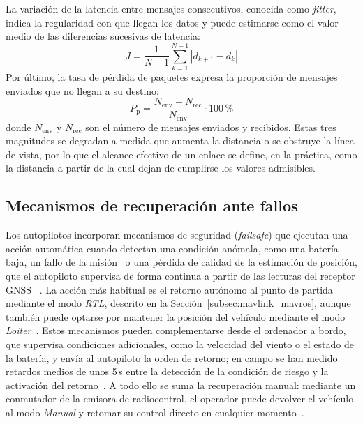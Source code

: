 La variación de la latencia entre mensajes consecutivos, conocida como \textit{jitter},
indica la regularidad con que llegan los datos y puede estimarse como el valor medio de
las diferencias sucesivas de latencia:
\begin{equation}
  J = \frac{1}{N-1}\sum_{k=1}^{N-1}\left| d_{k+1} - d_{k} \right|
  \label{eq:jitter}
\end{equation}
Por último, la tasa de pérdida de paquetes expresa la proporción de mensajes enviados
que no llegan a su destino:
\begin{equation}
  P_{\mathrm{p}} = \frac{N_{\mathrm{env}} - N_{\mathrm{rec}}}{N_{\mathrm{env}}}\cdot 100\,\%
  \label{eq:perdida_paquetes}
\end{equation}
donde $N_{\mathrm{env}}$ y $N_{\mathrm{rec}}$ son el número de mensajes enviados y
recibidos. Estas tres magnitudes se degradan a medida que aumenta la distancia o se
obstruye la línea de vista, por lo que el alcance efectivo de un enlace se define, en la
práctica, como la distancia a partir de la cual dejan de cumplirse los valores
admisibles.
 
\subsection{Mecanismos de recuperación ante fallos}
\label{subsec:failsafe}
 
Los autopilotos incorporan mecanismos de seguridad (\textit{failsafe}) que ejecutan una
acción automática cuando detectan una condición anómala, como una batería baja, un
fallo de la misión~\cite{kumar2025} o una pérdida de calidad de la estimación de
posición, que el autopiloto supervisa de forma continua a partir de las lecturas del
receptor GNSS~\cite{kumar2025} \cite{aliane2026}.
La acción más habitual es el retorno autónomo al punto de partida mediante el modo
\textit{RTL}, descrito en la Sección~\ref{subsec:mavlink_mavros}, aunque también puede optarse
por mantener la posición del vehículo mediante el modo \textit{Loiter}~\cite{kumar2025}. Estos mecanismos pueden
complementarse desde el ordenador a bordo, que supervisa condiciones adicionales, como
la velocidad del viento o el estado de la batería, y envía al autopiloto la orden de
retorno; en campo se han medido retardos medios de unos 5\,s entre la detección de la
condición de riesgo y la activación del retorno~\cite{sotelo2023}. A todo ello se suma la
recuperación manual: mediante un conmutador de la emisora de radiocontrol, el operador
puede devolver el vehículo al modo \textit{Manual} y retomar su control directo en
cualquier momento~\cite{iniesta2025}.